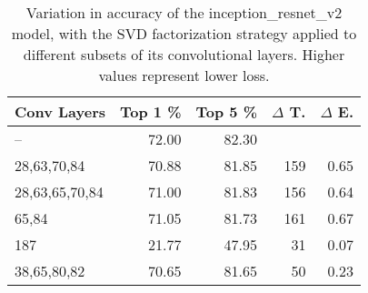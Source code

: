 \begin{table}
\centering
\begin{tabular}{|l|r|r|r|r|}
\hline
Conv Layers & Top 1 \% & Top 5 \% & $\Delta$ T. & $\Delta$ E. \\\hline
-- & 72.00 & 82.30 &  & \\\hline
28,63,70,84 & 70.88 & 81.85 & 159 & 0.65 \\\hline
28,63,65,70,84 & 71.00 & 81.83 & 156 & 0.64 \\\hline
65,84 & 71.05 & 81.73 & 161 & 0.67 \\\hline
187 & 21.77 & 47.95 & 31 & 0.07 \\\hline
38,65,80,82 & 70.65 & 81.65 & 50 & 0.23 \\\hline
\end{tabular}
\caption{Variation in accuracy of the inception\_resnet\_v2 model, with the SVD factorization strategy applied to different subsets of its convolutional layers. Higher values represent lower loss.}
\label{inception_resnet_v2-accuracy}
\end{table}
